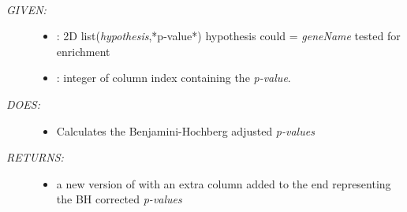 \documentclass[letterpaper,10pt,english]{sphinxmanual}
\begin{document}
\begin{fulllineitems}
\label{code:gfunc.stats.benjHochFDR}~\begin{description}
\item[{\emph{GIVEN:}}] \leavevmode\begin{itemize}
\item {} 
: 2D list(\emph{hypothesis},*p-value*) hypothesis could = \emph{geneName} tested for enrichment

\item {} 
: integer of column index containing the \emph{p-value}.

\end{itemize}

\item[{\emph{DOES:}}] \leavevmode\begin{itemize}
\item {} 
Calculates the Benjamini-Hochberg adjusted \emph{p-values}

\end{itemize}

\item[{\emph{RETURNS:}}] \leavevmode\begin{itemize}
\item {} 
a new version of  with an extra column added to the end representing the BH corrected \emph{p-values}

\end{itemize}

\end{description}

\end{fulllineitems}

\end{document}
